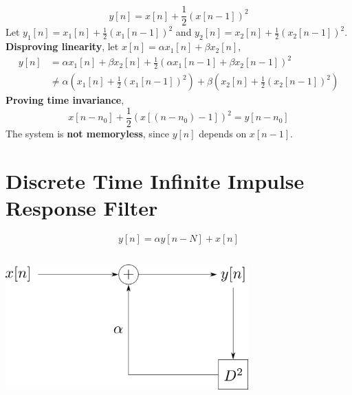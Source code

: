 \documentclass{article}
\begin{document}
\subsection{}

\begin{equation}
    y[n] = x[n] + \frac{1}{2} (x[n - 1])^2
\end{equation}
Let \(y_1[n] = x_1[n] + \frac{1}{2} (x_1[n - 1])^2\) and \(y_2[n] = x_2[n] + \frac{1}{2} (x_2[n - 1])^2\).
\textbf{Disproving linearity}, let \(x[n] = \alpha x_1[n] + \beta x_2[n]\),
\begin{align}
    y[n] &= \alpha x_1[n] + \beta x_2[n] + \frac{1}{2} (\alpha x_1[n - 1] + \beta x_2[n - 1])^2 \\
    &\neq \alpha \left(x_1[n] + \frac{1}{2} (x_1[n - 1])^2\right) + \beta \left(x_2[n] + \frac{1}{2} (x_2[n - 1])^2\right)
\end{align}
\textbf{Proving time invariance},
\begin{equation}
    x[n - n_0] + \frac{1}{2} (x[(n - n_0) - 1])^2 = y[n - n_0]
\end{equation}
The system is \textbf{not memoryless}, since \(y[n]\) depends on \(x[n - 1]\).

\section{Discrete Time Infinite Impulse Response Filter}

\begin{equation}
    y[n] = \alpha y[n - N] + x[n]
\end{equation}

\subsection{}

\begin{center}
    \includegraphics[width=0.7\textwidth]{q3-1.png}
\end{center}
\end{document}
